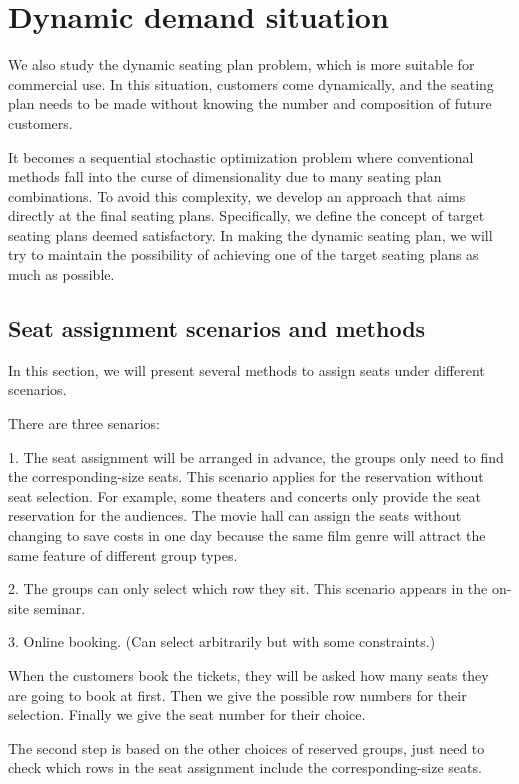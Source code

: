 \section{Dynamic demand situation}\label{dynamic_demand}

We also study the dynamic seating plan problem, which is more suitable for commercial use. In this situation, customers come dynamically, and the seating plan needs to be made without knowing the number and composition of future customers. 

It becomes a sequential stochastic optimization problem where conventional methods fall into the curse of dimensionality due to many seating plan combinations. To avoid this complexity, we develop an approach that aims directly at the final seating plans. Specifically, we define the concept of target seating plans deemed satisfactory. In making the dynamic seating plan, we will try to maintain the possibility of achieving one of the target seating plans as much as possible.

\subsection{Seat assignment scenarios and methods}
In this section, we will present several methods to assign seats under different scenarios.

There are three senarios:

1. The seat assignment will be arranged in advance, the groups only need to find the corresponding-size seats. This scenario applies for the reservation without seat selection. For example, some theaters and concerts only provide the seat reservation for the audiences. The movie hall can assign the seats without changing to save costs in one day because the same film genre will attract the same feature of different group types.

2. The groups can only select which row they sit. This scenario appears in the on-site seminar. 


3. Online booking. (Can select arbitrarily but with some constraints.)

When the customers book the tickets, they will be asked how many seats they are going to book at first. Then we give the possible row numbers for their selection. Finally we give the seat number for their choice.

The second step is based on the other choices of reserved groups, just need to check which rows in the seat assignment include the corresponding-size seats.

